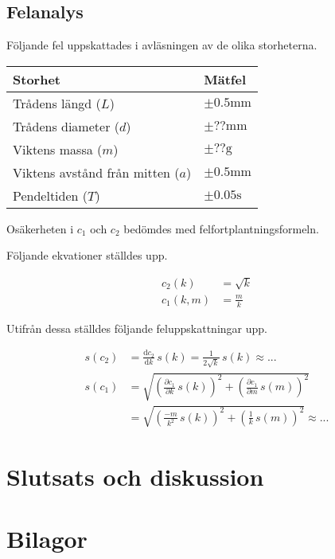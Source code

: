 \documentclass[a4paper,12pt]{article}
\newcommand*{\dd}{\mathrm{d}}
\begin{document}
\subsection{Felanalys}

Följande fel uppskattades i avläsningen av de olika storheterna.

\begin{tabular}{|l|l|}
  \hline
  \textbf{Storhet} & \textbf{Mätfel} \\\hline
  Trådens längd ($L$) & $\pm 0.5 \text{mm}$ \\\hline
  Trådens diameter ($d$) & $\pm ?? \text{mm}$ \\\hline
  Viktens massa ($m$) & $\pm ?? \text{g}$ \\\hline
  Viktens avstånd från mitten ($a$) & $\pm 0.5 \text{mm}$ \\\hline
  Pendeltiden ($T$) & $\pm 0.05 \text{s}$ \\\hline
\end{tabular}

Osäkerheten i $c_1$ och $c_2$ bedömdes med felfortplantningsformeln.

Följande ekvationer ställdes upp.

\begin{align}
  c_2(k) &= \sqrt{k} \\
  c_1(k, m) &= \frac{m}{k}
\end{align} 

Utifrån dessa ställdes följande feluppskattningar upp.

\begin{align}
  s(c_2) &= \frac{\dd c_2}{\dd k} \, s(k) = \frac{1}{2\sqrt{k}} \, s(k) \approx ...\\
  s(c_1) &= \sqrt{\left( \frac{\partial c_1}{\partial k} \, s(k) \right)^2 + \left( \frac{\partial c_1}{\partial m} \, s(m) \right)^2} \nonumber \\
         &= \sqrt{\left( \frac{-m}{k^2} \, s(k) \right)^2 + \left( \frac{1}{k} \, s(m) \right)^2} \approx ...
\end{align}

\section{Slutsats och diskussion}
\lipsum[1-2]

\clearpage
\appendix
\section{Bilagor}
\end{document}
